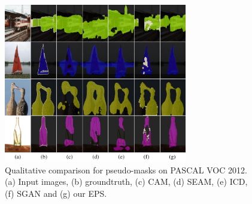 \begin{figure}[t]
\centering
\includegraphics[width=8cm]{figures/fig_ablation.pdf}
\caption{Qualitative comparison for pseudo-masks on PASCAL VOC 2012. (a) Input images, (b) groundtruth, (c) CAM, (d) SEAM, (e) ICD, (f) SGAN and (g) our EPS.}
\label{fig:ablation} \vspace{-3mm}
\end{figure}

